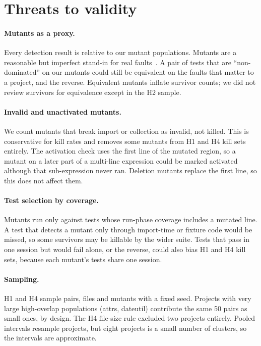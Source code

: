 \section{Threats to validity}
\label{sec:threats}

\paragraph{Mutants as a proxy.} Every detection result is relative to our mutant populations. Mutants are a reasonable but imperfect stand-in for real faults~\cite{just2014mutants}. A pair of tests that are ``non-dominated'' on our mutants could still be equivalent on the faults that matter to a project, and the reverse. Equivalent mutants inflate survivor counts; we did not review survivors for equivalence except in the H2 sample.

\paragraph{Invalid and unactivated mutants.} We count mutants that break import or collection as invalid, not killed. This is conservative for kill rates and removes some mutants from H1 and H4 kill sets entirely. The activation check uses the first line of the mutated region, so a mutant on a later part of a multi-line expression could be marked activated although that sub-expression never ran. Deletion mutants replace the first line, so this does not affect them.

\paragraph{Test selection by coverage.} Mutants run only against tests whose run-phase coverage includes a mutated line. A test that detects a mutant only through import-time or fixture code would be missed, so some survivors may be killable by the wider suite. Tests that pass in one session but would fail alone, or the reverse, could also bias H1 and H4 kill sets, because each mutant's tests share one session.

\paragraph{Sampling.} H1 and H4 sample pairs, files and mutants with a fixed seed. Projects with very large high-overlap populations (attrs, dateutil) contribute the same 50 pairs as small ones, by design. The H4 file-size rule excluded two projects entirely. Pooled intervals resample projects, but eight projects is a small number of clusters, so the intervals are approximate.

